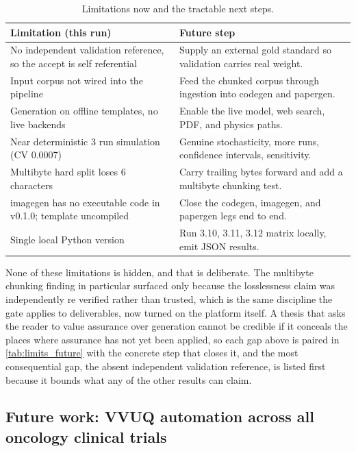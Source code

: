 \begin{table}[H]
\caption{Limitations now and the tractable next steps.}
\label{tab:limits_future}
\centering
\begin{tabularx}{\textwidth}{L{6.2cm} >{\raggedright\arraybackslash}X}
\toprule
\textbf{Limitation (this run)} & \textbf{Future step} \\
\midrule
  No independent validation reference, so the accept is self referential & Supply an external gold standard so validation carries real weight. \\
  Input corpus not wired into the pipeline & Feed the chunked corpus through ingestion into codegen and papergen. \\
  Generation on offline templates, no live backends & Enable the live model, web search, PDF, and physics paths. \\
  Near deterministic 3 run simulation (CV 0.0007) & Genuine stochasticity, more runs, confidence intervals, sensitivity. \\
  Multibyte hard split loses 6 characters & Carry trailing bytes forward and add a multibyte chunking test. \\
  imagegen has no executable code in v0.1.0; template uncompiled & Close the codegen, imagegen, and papergen legs end to end. \\
  Single local Python version & Run 3.10, 3.11, 3.12 matrix locally, emit JSON results. \\
\bottomrule
\end{tabularx}
\end{table}

None of these limitations is hidden, and that is deliberate. The multibyte
chunking finding in particular surfaced only because the losslessness claim was
independently re verified rather than trusted, which is the same discipline the
gate applies to deliverables, now turned on the platform itself. A thesis that
asks the reader to value assurance over generation cannot be credible if it
conceals the places where assurance has not yet been applied, so each gap above
is paired in \autoref{tab:limits_future} with the concrete step that closes it,
and the most consequential gap, the absent independent validation reference, is
listed first because it bounds what any of the other results can claim.

\subsection{Future work: VVUQ automation across all oncology clinical trials}

